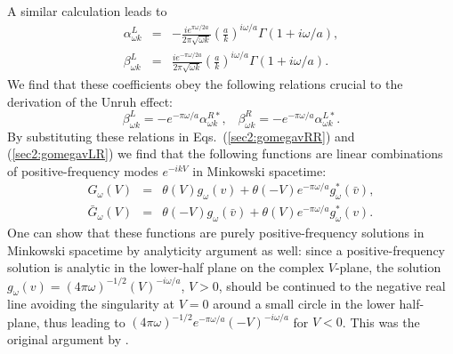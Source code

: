 \documentclass[12pt,nofootinbib,floatfix,aps,prd,showpacs,amsmath,amssymb,eqsecnum]{revtex4-2}
\begin{document}
A similar calculation leads to
\begin{eqnarray}
\alpha^L_{\omega k} & = & -\frac{ie^{\pi\omega/2a}}
{2\pi\sqrt{\omega k}}
\left(\frac{a}{k}\right)^{i\omega/a}\Gamma(1+i\omega/a),\\
\beta^L_{\omega k} & = & \frac{ie^{-\pi\omega/2a}}{2\pi\sqrt{\omega
k}}
\left(\frac{a}{k}\right)^{i\omega/a}\Gamma(1+i\omega/a).
\end{eqnarray}
We find that these coefficients obey the following relations crucial to
the derivation of the Unruh effect:
\begin{equation}
\beta^L_{\omega k}  =  - e^{-\pi\omega/a}\alpha^{R*}_{\omega k}, \;\;\;
\beta^R_{\omega k}  =  - e^{-\pi\omega/a}\alpha^{L*}_{\omega k}.
\label{sec2:betaalpha}
\end{equation}
By substituting these relations in Eqs.~(\ref{sec2:gomegavRR}) and
(\ref{sec2:gomegavLR}) we find that the following functions are linear
combinations of positive-frequency modes $e^{-ikV}$ in Minkowski spacetime:
\begin{eqnarray}
G_\omega(V) & = & \theta(V)g_\omega(v) +
\theta(-V)e^{-\pi\omega/a}g_{\omega}^*(\bar{v}),
\label{sec2:cruc1a}
\\
\bar{G}_\omega(V) & = & 
\theta(-V)g_\omega(\bar{v}) + \theta(V)e^{-\pi\omega/a}g_{\omega}^*(v).
\label{sec2:cruc2a}
\end{eqnarray}
One can show that these functions 
are purely positive-frequency solutions in Minkowski
spacetime by analyticity argument as well: since a positive-frequency
solution is analytic in the lower-half plane on the complex $V$-plane,
the solution $g_\omega(v) = (4\pi\omega)^{-1/2}(V)^{-i\omega/a}$, 
$V>0$, should be continued to the negative real line avoiding the
singularity at $V=0$ around a small circle in the lower half-plane, thus
leading to $(4\pi\omega)^{-1/2}e^{-\pi\omega/a}(-V)^{-i\omega/a}$ for
$V<0$. This was the original argument by \textcite{Unruh76}.
\end{document}
